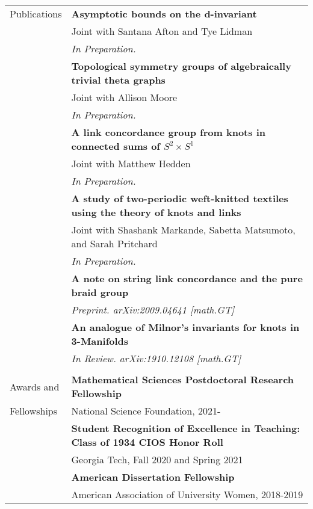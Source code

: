 \documentclass[letterpaper,11pt,oneside]{article}
\begin{document}
\begin{tabular}{@{} l l}
       \\
 \Large{Publications}   
          & \textbf{Asymptotic bounds on the d-invariant} \\
          & Joint with Santana Afton and Tye Lidman \\
     & \sl{In Preparation.}  \\
  & \textbf{Topological symmetry groups of algebraically trivial theta graphs} \\
     & Joint with Allison Moore\\
          & \sl{In Preparation.}  \\
  & \textbf{A link concordance group from knots in connected sums of $S^2 \times S^1$} \\
     & Joint with Matthew Hedden \\
     & \sl{In Preparation.}  \\
       & \textbf{A study of two-periodic weft-knitted textiles using the theory of knots and links}\\
     & Joint with Shashank Markande, Sabetta Matsumoto, and Sarah Pritchard \\
     & \sl{In Preparation.}  \\
         & \textbf{A note on string link concordance and the pure braid group} \\
     & \sl{Preprint. arXiv:2009.04641 [math.GT]}  \\
      & \textbf{An analogue of Milnor's invariants for knots in 3-Manifolds}  \\
     & \sl{In Review. arXiv:1910.12108 [math.GT]}  \\

     
 

     & \\
      \Large{Awards and }    & \textbf{Mathematical Sciences Postdoctoral Research Fellowship} \\
  \Large{Fellowships}   & National Science Foundation, 2021-\\
  & \textbf{Student Recognition of Excellence in Teaching: Class of 1934 CIOS Honor Roll}\\
     & Georgia Tech,  Fall 2020 and Spring 2021 \\
  & \textbf{American Dissertation Fellowship} \\
   & American Association of University Women, 2018-2019 \\
   \end{tabular}
\end{document}
